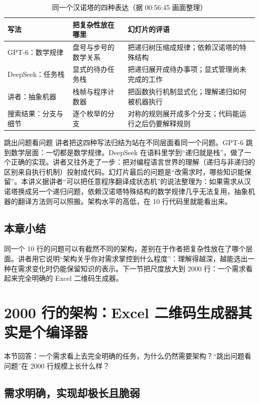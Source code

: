 \documentclass[a4paper]{article}
\begin{document}
\begin{table}[H]
\centering
\small
\begin{tabular}{p{2.6cm}p{4.4cm}p{6.4cm}}
\toprule
写法 & 把复杂性放在哪里 & 幻灯片的评语 \\
\midrule
GPT-6：数学规律 & 盘号与步号的数学关系 & 把递归树压缩成规律；依赖汉诺塔的特殊结构 \\
DeepSeek：任务栈 & 显式的待办任务栈 & 把递归展开成待办事项；显式管理尚未完成的工作 \\
讲者：抽象机器 & 栈帧与程序计数器 & 把函数执行机制显式化；理解递归如何被机器执行 \\
搜索结果：分支与细节 & 逐个枚举的分支 & 对称的规则展开成多个分支；代码能运行之后仍要解释规则 \\
\bottomrule
\end{tabular}
\caption{同一个汉诺塔的四种表达（据 00:56:45 画面整理）}
\end{table}

\begin{importantbox}{跳出问题看问题}
讲者把这四种写法归结为站在不同层面看同一个问题。GPT-6 跳到数学层面：一切都是数学规律。DeepSeek 在语料里学到“递归就是栈”，做了一个正确的实现。讲者又往外走了一步：把对编程语言世界的理解（递归与非递归的区别来自执行机制）投射成代码。幻灯片最后的问题是“改需求时，哪些知识能保留”。本讲义据讲者“可以把任意程序翻译成状态机”的说法整理为：如果需求从汉诺塔换成另一个递归问题，依赖汉诺塔特殊结构的数学规律几乎无法复用，抽象机器的翻译方法则可以照搬。架构水平的高低，在 10 行代码里就能看出来。
\end{importantbox}

\subsection{本章小结}

同一个 10 行的问题可以有截然不同的架构，差别在于作者把复杂性放在了哪个层面。讲者用它说明“架构关乎你对需求掌控到什么程度”：理解得越深，越能选出一种在需求变化时仍能保留知识的表示。下一节把尺度放大到 2000 行：一个需求看起来完全明确的 Excel 二维码生成器。
\section{2000 行的架构：Excel 二维码生成器其实是个编译器}

本节回答：一个需求看上去完全明确的任务，为什么仍然需要架构？“跳出问题看问题”在 2000 行规模上长什么样？

\subsection{需求明确，实现却极长且脆弱}
\end{document}
